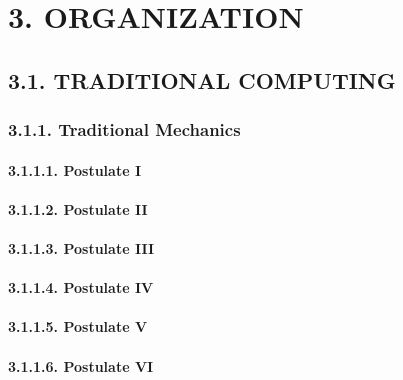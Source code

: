 \documentclass[
]{article}
\begin{document}
\hypertarget{organization-1}{%
\section{3. ORGANIZATION}\label{organization-1}}

\hypertarget{traditional-computing-1}{%
\subsection{3.1. TRADITIONAL COMPUTING}\label{traditional-computing-1}}

\hypertarget{traditional-mechanics-1}{%
\subsubsection{3.1.1. Traditional
Mechanics}\label{traditional-mechanics-1}}

\hypertarget{postulate-i-1}{%
\paragraph{3.1.1.1. Postulate I}\label{postulate-i-1}}

\hypertarget{postulate-ii-1}{%
\paragraph{3.1.1.2. Postulate II}\label{postulate-ii-1}}

\hypertarget{postulate-iii-1}{%
\paragraph{3.1.1.3. Postulate III}\label{postulate-iii-1}}

\hypertarget{postulate-iv-1}{%
\paragraph{3.1.1.4. Postulate IV}\label{postulate-iv-1}}

\hypertarget{postulate-v-1}{%
\paragraph{3.1.1.5. Postulate V}\label{postulate-v-1}}

\hypertarget{postulate-vi-1}{%
\paragraph{3.1.1.6. Postulate VI}\label{postulate-vi-1}}
\end{document}
